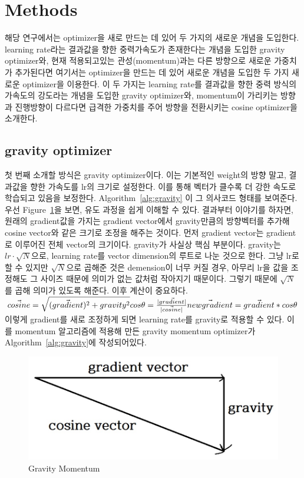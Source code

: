 \documentclass{article}
\begin{document}
\section{Methods}
해당 연구에서는 optimizer을 새로 만드는 데 있어 두 가지의 새로운 개념을 도입한다. learning rate라는 결과값을 향한 중력가속도가 존재한다는 개념을 도입한 gravity optimizer와, 현재 적용되고있는 관성(momentum)과는 다른 방향으로 새로운 가중치가 추가된다면 여기서는 optimizer을 만드는 데 있어 새로운 개념을 도입한 두 가지 새로운 optimizer을 이용한다. 이 두 가지는 learning rate를 결과값을 향한 중력 방식의 가속도의 강도라는 개념을 도입한 gravity optimizer와, momentum이 가리키는 방향과 진행방향이 다르다면 급격한 가중치를 주어 방향을 전환시키는 cosine optimizer을 소개한다.

\subsection{gravity optimizer}
첫 번째 소개할 방식은 gravity optimizer이다. 이는 기본적인 weight의 방향 말고, 결과값을 향한 가속도를 lr의 크기로 설정한다. 이를 통해 벡터가 클수록 더 강한 속도로 학습되고 있음을 보정한다. Algorithm~\ref{alg:gravity} 이 그 의사코드 형태를 보여준다. \\
우선 Figure~\ref{prf:gravity}을 보면, 유도 과정을 쉽게 이해할 수 있다. 결과부터 이야기를 하자면, 원래의 gradient값을 가지는 gradient vector에서 gravity만큼의 방향벡터를 추가해 cosine vector와 같은 크기로 조정을 해주는 것이다. 먼저 gradient vector는 gradient로 이루어진 전체 vector의 크기이다. gravity가 사실상 핵심 부분이다. gravity는 $lr\cdot\sqrt{N}$으로, learning rate를 vector dimension의 루트로 나눈 것으로 한다. 그냥 lr로 할 수 있지만 $\sqrt{N}$으로 곱해준 것은 demension이 너무 커질 경우, 아무리 lr을 값을 조정해도 그 사이즈 때문에 의미가 없는 값처럼 작아지기 때문이다. 그렇기 때문에 $\sqrt{N}$를 곱해 의미가 있도록 해준다. 이후 계산이 중요하다. \\
$\vec{cosine}=\sqrt{(\vec{gradient})^2+gravity^2} \\
cos\theta=\frac{|\vec{gradient|}}{|\vec{cosine}|} \\
\vec{newgradient}=\vec{gradient}*cos\theta $ \\
이렇게 gradient를 새로 조정하게 되면 learning rate를 gravity로 적용할 수 있다. 이를 momentum 알고리즘에 적용해 만든 gravity momentum optimizer가 Algorithm~\ref{alg:gravity}에 작성되어있다.

\begin{figure}
   \includegraphics[width=\columnwidth]{img/cosine vector.jpg}
   \caption{Gravity Momentum}
   \label{prf:gravity}
\end{figure}
\end{document}
